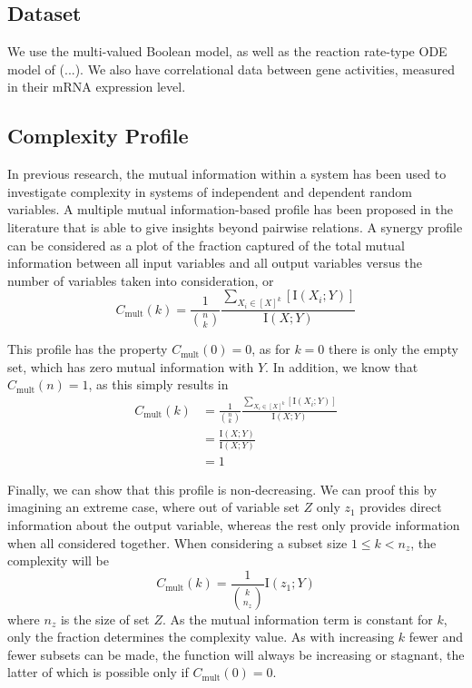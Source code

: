 \documentclass[../main.tex]{subfiles}
\begin{document}
\subsection{Dataset}

We use the multi-valued Boolean model, as well as the reaction rate-type ODE model of (...).
We also have correlational data between gene activities, measured in their mRNA expression level.

\subsection{Complexity Profile}

In previous research, the mutual information within a system has been used to investigate complexity in systems of independent and dependent random variables.
A multiple mutual information-based profile has been proposed in the literature that is able to give insights beyond pairwise relations.
A synergy profile can be considered as a plot of the fraction captured of the total mutual information between all input variables and all output variables versus the number of variables taken into consideration, or
%
\begin{equation}
C_\mathrm{mult}(k) = \frac{1}{\binom{n}{k}}\frac{\sum_{X_i \in [X]^k} [\mathrm{I}(X_i;Y)]}{\mathrm{I}(X;Y)}
\end{equation}

This profile has the property $C_\mathrm{mult}(0) = 0$, as for $k = 0$ there is only the empty set, which has zero mutual information with $Y$.
In addition, we know that $C_\mathrm{mult}(n) = 1$, as this simply results in
%
\begin{align}
C_\mathrm{mult}(k) 
&= \frac{1}{\binom{n}{k}}\frac{\sum_{X_i \in [X]^k} [\mathrm{I}(X_i;Y)]}{\mathrm{I}(X;Y)} \\
&= \frac{\mathrm{I}(X;Y)}{\mathrm{I}(X;Y)} \\
&= 1
\end{align}

Finally, we can show that this profile is non-decreasing.
We can proof this by imagining an extreme case, where out of variable set $Z$ only $z_1$ provides direct information about the output variable, whereas the rest only provide information when all considered together.
When considering a subset size $1 \le k < n_z $, the complexity will be
%
\begin{equation}
C_\mathrm{mult}(k) = \frac{1}{\binom{k}{n_z}} \mathrm{I}(z_1;Y)
\end{equation}
%
where $n_z$ is the size of set $Z$.
As the mutual information term is constant for $k$, only the fraction determines the complexity value.
As with increasing $k$ fewer and fewer subsets can be made, the function will always be increasing or stagnant, the latter of which is possible only if $C_\mathrm{mult}(0) = 0$.
\end{document}

